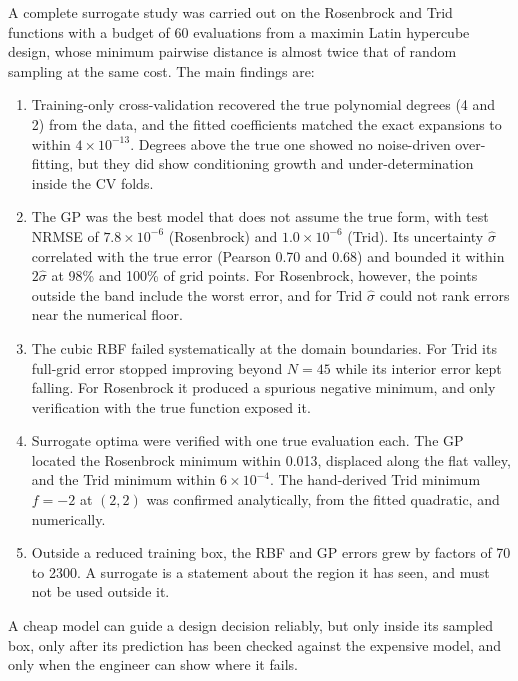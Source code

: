 A complete surrogate study was carried out on the Rosenbrock and Trid functions with a budget of 60 evaluations from a maximin Latin hypercube design, whose minimum pairwise distance is almost twice that of random sampling at the same cost. The main findings are:
\begin{enumerate}
  \item Training-only cross-validation recovered the true polynomial degrees (4 and 2) from the data, and the fitted coefficients matched the exact expansions to within $4\times10^{-13}$. Degrees above the true one showed no noise-driven over-fitting, but they did show conditioning growth and under-determination inside the CV folds.
  \item The GP was the best model that does not assume the true form, with test NRMSE of $7.8\times10^{-6}$ (Rosenbrock) and $1.0\times10^{-6}$ (Trid). Its uncertainty $\hat\sigma$ correlated with the true error (Pearson 0.70 and 0.68) and bounded it within $2\hat\sigma$ at 98\% and 100\% of grid points. For Rosenbrock, however, the points outside the band include the worst error, and for Trid $\hat\sigma$ could not rank errors near the numerical floor.
  \item The cubic RBF failed systematically at the domain boundaries. For Trid its full-grid error stopped improving beyond $N=45$ while its interior error kept falling. For Rosenbrock it produced a spurious negative minimum, and only verification with the true function exposed it.
  \item Surrogate optima were verified with one true evaluation each. The GP located the Rosenbrock minimum within 0.013, displaced along the flat valley, and the Trid minimum within $6\times10^{-4}$. The hand-derived Trid minimum $f=-2$ at $(2,2)$ was confirmed analytically, from the fitted quadratic, and numerically.
  \item Outside a reduced training box, the RBF and GP errors grew by factors of 70 to 2300. A surrogate is a statement about the region it has seen, and must not be used outside it.
\end{enumerate}
A cheap model can guide a design decision reliably, but only inside its sampled box, only after its prediction has been checked against the expensive model, and only when the engineer can show where it fails.
